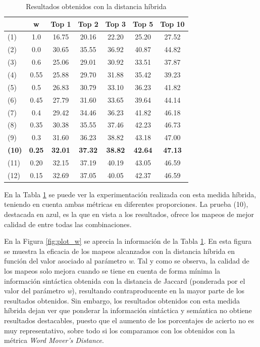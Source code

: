 \setlength{\tabcolsep}{4pt} 
\begin{table}[H]
\centering
\begin{tabular}{p{}c|c|c|c|c|c} 
& \textbf{w} & \textbf{Top 1}& \textbf{Top 2} & \textbf{Top 3} & \textbf{Top 5} & \textbf{Top 10} \\ \hline
(1)& 1.0 & 16.75 & 20.16 & 22.20 & 25.20 & 27.52 \\
(2)& 0.0 &  30.65 & 35.55 & 36.92 & 40.87 & 44.82 \\
(3)& 0.6 &  25.06 & 29.01 & 30.92 & 33.51 & 37.87 \\
(4)& 0.55 &  25.88 & 29.70 & 31.88 & 35.42 & 39.23 \\
(5)& 0.5 &  26.83 & 30.79 & 33.10 & 36.23 & 41.82 \\
(6)& 0.45 &  27.79 & 31.60 & 33.65 & 39.64 & 44.14 \\
(7)& 0.4 &  29.42 & 34.46 & 36.23 & 41.82 & 46.18 \\
(8)& 0.35 &  30.38 & 35.55 & 37.46 & 42.23 & 46.73 \\
(9)& 0.3 &  31.60 & 36.23 & 38.82 & 43.18 & 47.00 \\
\textcolor{UniBlue}{\textbf{(10)}}& \textcolor{UniBlue}{\textbf{0.25}}  & \textcolor{UniBlue}{\textbf{32.01}} & \textcolor{UniBlue}{\textbf{37.32}} & \textcolor{UniBlue}{\textbf{38.82}} & \textcolor{UniBlue}{\textbf{42.64}}  & \textcolor{UniBlue}{\textbf{47.13}} \\
(11)& 0.20 & 32.15 & 37.19 & 40.19 & 43.05 & 46.59 \\
(12)& 0.15 & 32.69 & 37.05 & 40.05 & 42.37 & 46.59 

\end{tabular}
\caption{\label{table:hybrid} Resultados obtenidos con la distancia híbrida}
\end{table}

En la Tabla \ref{table:hybrid} se puede ver la experimentación realizada con esta medida híbrida, teniendo en cuenta ambas métricas en diferentes proporciones. La prueba (10), destacada en azul, es la que en vista a los resultados, ofrece los mapeos de mejor calidad de entre todas las combinaciones. 

En la Figura \ref{fig:plot_w} se aprecia la información de la Tabla \ref{table:hybrid}. En esta figura se muestra la eficacia de los mapeos alcanzados con la distancia híbrida en función del valor asociado al parámetro \textit{w}. Tal y como se observa, la calidad de los mapeos solo mejora cuando se tiene en cuenta de forma mínima la información sintáctica obtenida con la distancia de Jaccard (ponderada por el valor del parámetro \textit{w}), resultando contraproducente en la mayor parte de los resultados obtenidos. Sin embargo, los resultados obtenidos con esta medida híbrida dejan ver que ponderar la información sintáctica y semántica no obtiene resultados destacables, puesto que el aumento de los porcentajes de acierto no es muy representativo, sobre todo si los comparamos con los obtenidos con la métrica \textit{Word Mover's Distance}. 

